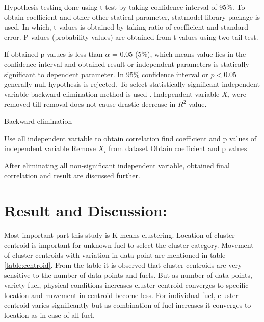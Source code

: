 \documentclass[preprint,12pt]{elsarticle}
\begin{document}
				  
				  Hypothesis testing done using t-test by taking confidence interval of 95\%. To obtain coefficient and other other statical parameter, statmodel \cite{statsmodels} library package is used. In which, t-values is obtained by taking ratio of coefficient and standard error. P-values (probability values) are obtained from t-values using two-tail test. 
				  
				  If obtained p-values is less than $\alpha$ = 0.05 (5\%), which means value lies in the confidence interval and obtained result or independent parameters  is statically significant to dependent parameter. In 95\%  confidence interval or $p<0.05$ generally null hypothesis is rejected. To select statistically significant independent variable backward elimination method is used \cite{handbook}. Independent variable $X_i$ were removed till removal does not cause drastic decrease in $R^2$ value.  
				  		
				  		\begin{algorithm}
				  			\caption{Backward elimination}\label{alg:backeli}
				  			\begin{algorithmic}[1]
				  				\State Use all independent variable to obtain correlation 
				  				\State find coefficient  and p values of independent variable
				  				\State Remove $X_i$ from dataset 
				  				\State Obtain coefficient  and p values
				  				\EndWhile
				  				
				  			\end{algorithmic}
				  		\end{algorithm}
				  
				  After  eliminating all non-significant independent variable, obtained final correlation and result are discussed further.
				  
				  \section{Result and Discussion:}
				  Most important part this study is K-means clustering. Location of cluster centroid is important for unknown fuel to select the cluster category. Movement of cluster centroids with variation in data point are mentioned in table-\ref{table:centroid}. From the table it is observed that cluster centroids are very sensitive to the number of data points and fuels. But as number of data points, variety fuel, physical conditions increases cluster centroid converges to specific location and movement in centroid become less. For individual fuel, cluster centroid varies significantly but as combination of fuel increases it converges  to location as in case of all fuel.
				  
\end{document}
